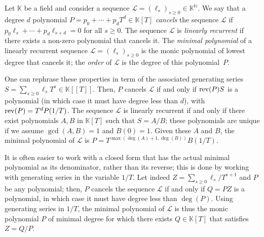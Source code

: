 \documentclass[12pt]{article}
\newcommand{\genseries}{Z}
\newcommand{\minpoly}{P}
\def\N {\ensuremath{\mathbb{N}}}
\def\K{\mathbb{K}}
\def\K {\ensuremath{\mathbb{K}}}
\begin{document}
Let $\K$ be a field and consider a sequence $\mathcal{L}=(\ell_s)_{s
  \ge 0} \in \K^\N$. We say that a degree $d$ polynomial $\minpoly =
p_0 + \cdots + p_d T^d \in\K[T]$ {\em cancels} the sequence
$\mathcal{L}$ if $p_0 \ell_s + \cdots + p_d \ell_{s+d}=0$ for all $s
\ge 0$. The sequence $\mathcal{L}$ is {\em linearly recurrent} if
there exists a non-zero polynomial that cancels it.  The {\em minimal
  polynomial} of a linearly recurrent sequence
$\mathcal{L}=(\ell_s)_{s \ge 0}$ is the monic polynomial of lowest
degree that cancels it; the {\em order} of $\mathcal{L}$ is the degree
of this polynomial~$\minpoly$.

One can rephrase these properties in term of the associated generating
series $S=\sum_{s \ge 0} \ell_s T^s \in \K[[T]]$.  Then, $\minpoly$
cancels $\mathcal{L}$ if and only if ${\rm rev}(\minpoly) S$ is a
polynomial (in which case it must have degree less than $d$), with
${\rm rev}(\minpoly)=T^d \minpoly(1/T)$.  The sequence $\mathcal{L}$ 
is linearly recurrent if and only if there
exist polynomials $A,B$ in $\K[T]$ such that $S=A/B$; these
polynomials are unique if we assume $\gcd(A,B)=1$ and $B(0)=1$.  Given
these $A$ and $B$, the minimal polynomial of $\mathcal{L}$ is
$\minpoly = T^{\max(\deg(A)+1,\deg(B))}B(1/T)$. 

It is often easier to work with a closed form that has the actual
minimal polynomial as its denominator, rather than its reverse; this
is done by working with generating series in the variable $1/T$.  Let
indeed $\genseries = \sum_{s\ge0} \ell_s / T^{s+1}$ and $\minpoly$
be any polynomial; then, $\minpoly$ cancels the sequence $\mathcal{L}$
if and only if $Q=\minpoly \genseries $ is a polynomial, in which case it
must have degree less than $\deg(\minpoly)$.  Using generating series in
$1/T$, the minimal polynomial of $\mathcal{L}$ is thus the
monic polynomial $\minpoly$ of minimal degree for which there exists $Q \in
\K[T]$ that satisfies $\genseries=Q/\minpoly$.
\end{document}
